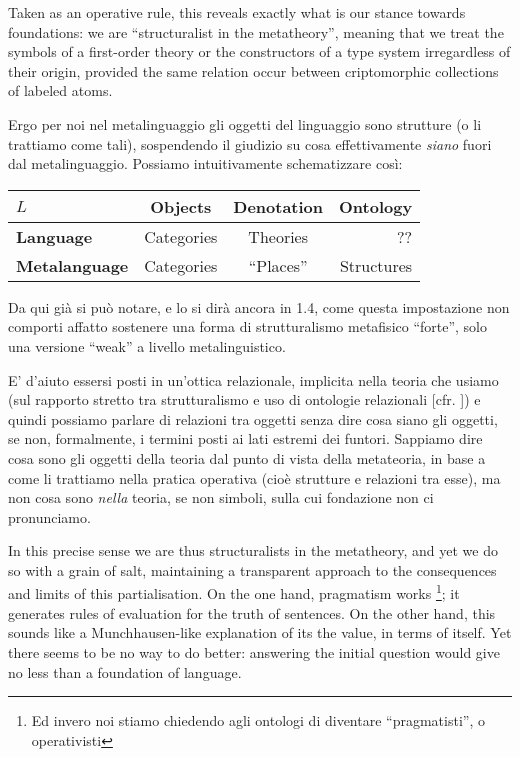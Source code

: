 Taken as an operative rule, this reveals exactly what is our stance towards foundations: we are ``structuralist in the metatheory'', meaning that we treat the symbols of a first-order theory or the constructors of a type system irregardless of their origin, provided the same relation occur between criptomorphic collections of labeled atoms.
\begin{italian}
\begin{remark}
	Ergo per noi nel metalinguaggio gli oggetti del linguaggio sono strutture (o li trattiamo come tali), sospendendo il giudizio su cosa effettivamente \emph{siano} fuori dal metalinguaggio. Possiamo intuitivamente schematizzare così:
	\begin{center}
		\begin{tabular}{lccr}\toprule
			$L$                   & Objects    & Denotation & Ontology   \\
			\midrule
			\textbf{Language}     & Categories & Theories   & ??         \\
			\midrule
			\textbf{Metalanguage} & Categories & ``Places'' & Structures
		\end{tabular}
	\end{center}
	Da qui già si può notare, e lo si dirà ancora in 1.4, come questa impostazione non comporti affatto sostenere una forma di strutturalismo metafisico ``forte'', solo una versione ``weak'' a livello metalinguistico.

	E' d'aiuto essersi posti in un'ottica relazionale, implicita nella teoria che usiamo (sul rapporto stretto tra strutturalismo e uso di ontologie relazionali [cfr. \cite{??}]) e quindi possiamo parlare di relazioni tra oggetti senza dire cosa siano gli oggetti, se non, formalmente, i termini posti ai lati estremi dei funtori. Sappiamo dire cosa sono gli oggetti della teoria dal punto di vista della metateoria, in base a come li trattiamo nella pratica operativa (cioè strutture e relazioni tra esse), ma non cosa sono \textit{nella} teoria, se non simboli, sulla cui fondazione non ci pronunciamo.
\end{remark}
\end{italian}
In this precise sense we are thus structuralists in the metatheory, and yet we do so with a grain of salt, maintaining a transparent approach to the consequences and limits of this partialisation. On the one hand, pragmatism works \footnote{Ed invero noi stiamo chiedendo agli ontologi di diventare ``pragmatisti'', o operativisti}; it generates rules of evaluation for the truth of sentences. On the other hand, this sounds like a Munchhausen-like explanation of its the value, in terms of itself. Yet there seems to be no way to do better: answering the initial question would give no less than a foundation of language.

